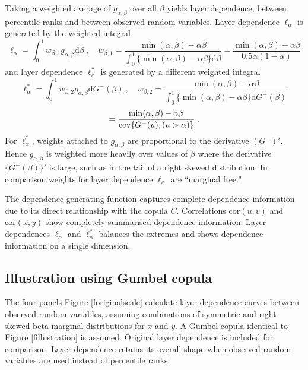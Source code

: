 \documentclass[authoryear]{elsarticle}
\newcommand{\cov}{{\rm cov}}
\newcommand{\cor}{\mathrm{cor}}
\newcommand{\de}{\mathrm{d}}
\newcommand{\cq}{\ ,\quad }
\newcommand{\fref}[1]{Figure \ref{#1}}
\begin{document}
Taking a weighted average of $g_{\alpha,\beta}$ over all $\beta$ yields layer dependence, between percentile ranks and between observed random variables. Layer dependence $\ell_\alpha$ is generated by the weighted integral
$$
\ell_\alpha= \int_0^1 w_{\beta,1} g_{\alpha,\beta} \de\beta
\cq w_{\beta,1}=\frac{\min(\alpha,\beta)-\alpha\beta}{\int_0^1 \{\min(\alpha,\beta)-\alpha\beta\}\de\beta}
=\frac{\min(\alpha,\beta)-\alpha\beta}{0.5\alpha(1-\alpha)}
$$
and layer dependence $\ell_\alpha^*$ is generated by a different weighted integral
$$
\ell_\alpha^* = \int_0^1 w_{\beta,2}   g_{\alpha,\beta} \de G^-(\beta)
\cq w_{\beta,2}=\frac{\min(\alpha,\beta)-\alpha\beta}{\int_0^1 \{ \min(\alpha,\beta)-\alpha\beta\}\de G^-(\beta)}
$$
$$
=\frac{\min(\alpha,\beta)-\alpha\beta}{\cov \{G^-(u),(u>\alpha)\}}  \;.
$$
For $\ell_\alpha^*$, weights attached to $g_{\alpha,\beta}$ are proportional to the derivative $(G^-)'$. Hence $g_{\alpha,\beta}$ is weighted more heavily over values of $\beta$ where the derivative $\{G^-(\beta)\}'$ is large, such as in the tail of a right skewed distribution. In comparison weights for layer dependence $\ell_\alpha$ are ``marginal free."

The dependence generating function captures complete dependence information due to its direct relationship with the copula $C$. Correlations $\cor(u,v)$ and $\cor(x,y)$ show completely summarised dependence information. Layer dependences $\ell_\alpha$ and $\ell_\alpha^*$ balances the extremes and shows dependence information on a single dimension.


\subsection{Illustration using Gumbel copula}

The four panels \fref{foriginalscale} calculate layer dependence curves between observed random variables, assuming combinations of symmetric and right skewed beta marginal distributions for $x$ and $y$. A Gumbel copula identical to \fref{fillustration} is assumed. Original layer dependence is included for comparison. Layer dependence retains its overall shape when observed random variables are used instead of percentile ranks.
\end{document}
